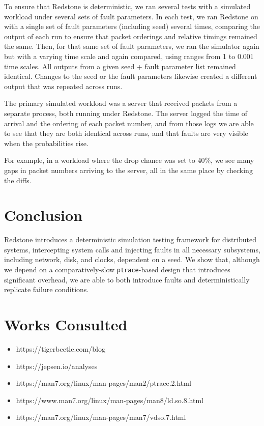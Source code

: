 {\fontsize{12}{15}\selectfont 

To ensure that Redstone is deterministic, we ran several tests with a simulated workload under several sets of fault parameters. In each test, we ran Redstone
on with a single set of fault parameters (including seed) several times, comparing the output of each run to ensure that packet orderings and relative timings remained the same. Then, for that same set of fault parameters, we ran the simulator again but with a varying time scale and again compared, using ranges from 1 to 0.001 time scales. All outputs from a given seed + fault parameter list remained identical. Changes to the seed or the fault parameters likewise created a different output that was repeated across runs.

The primary simulated workload was a server that received packets from a separate process, both running under Redstone. The server logged the time of arrival and the ordering of each packet number, and from those logs we are able to see that they are both identical across runs, and that faults are very visible when the probabilities rise.

For example, in a workload where the drop chance was set to 40$\%$, we see many gaps in packet numbers arriving to the server, all in the same place by checking the diffs.

}

\section{\txtrsdust Conclusion}

{\fontsize{12}{15}\selectfont 
Redstone introduces a deterministic simulation testing framework for distributed systems,
intercepting system calls and injecting faults in all necessary subsystems,
including network, disk, and clocks, dependent on a seed.
We show that,
although we depend on a comparatively-slow \texttt{ptrace}-based design that introduces significant overhead,
we are able to both introduce faults and deterministically replicate failure conditions.

}

\section{\txtrsdust Works Consulted}

{\fontsize{12}{15}\selectfont 
\begin{itemize}
\item https://tigerbeetle.com/blog
\item https://jepsen.io/analyses
\item https://man7.org/linux/man-pages/man2/ptrace.2.html
\item https://www.man7.org/linux/man-pages/man8/ld.so.8.html
\item https://man7.org/linux/man-pages/man7/vdso.7.html
\end{itemize}

}

